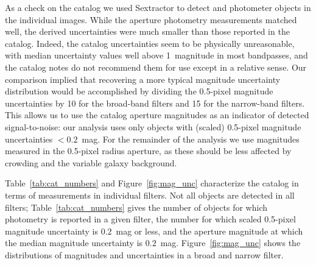 As a check on the catalog we used Sextractor to detect and photometer objects in the individual images.
While the aperture photometry measurements matched well, the derived uncertainties were much smaller than those reported in the catalog.
Indeed, the catalog uncertainties seem to be physically unreasonable, with median uncertainty values well above 1~magnitude in
most bandpasses, and the catalog notes do not recommend them for use except in a relative sense.
Our comparison implied that recovering a more typical magnitude uncertainty distribution would be accomplished by
dividing the 0.5-pixel magnitude uncertainties  by 10 for the broad-band filters and 15 for the narrow-band filters.
This allows us to use the catalog aperture magnitudes as an indicator of detected signal-to-noise: our analysis uses only objects with
(scaled) 0.5-pixel magnitude uncertainties $<0.2$~mag.
For the remainder of the analysis we use magnitudes measured in the 0.5-pixel radius aperture, as these should be less affected
by crowding and the variable galaxy background.

Table~\ref{tab:cat_numbers} and Figure~\ref{fig:mag_unc} characterize the catalog in terms of measurements in individual filters.
Not all objects are detected in all filters;
Table~\ref{tab:cat_numbers} gives the number of objects for which photometry is reported in a given filter,
the number for which scaled 0.5-pixel magnitude uncertainty is $0.2$~mag or less,
and the aperture magnitude at which the median magnitude uncertainty is $0.2$~mag. %
Figure~\ref{fig:mag_unc} shows the distributions of magnitudes and uncertainties in a broad and narrow filter. %

